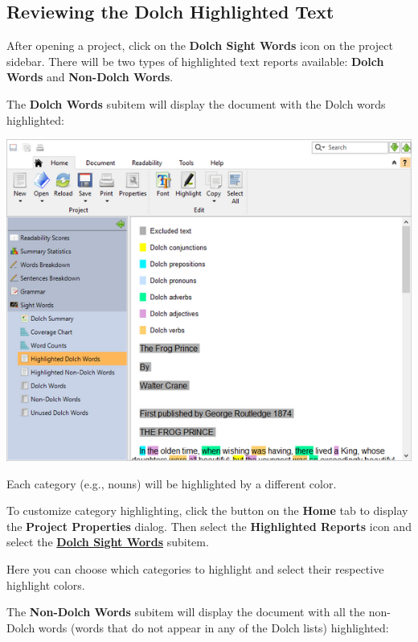 \documentclass[
]{book}
\theoremstyle{definition}
\theoremstyle{definition}
\theoremstyle{definition}
\theoremstyle{definition}
\theoremstyle{remark}
\begin{document}
\hypertarget{reviewing-dolch-text}{%
\subsection*{Reviewing the Dolch Highlighted Text}\label{reviewing-dolch-text}}

After opening a project, click on the \textbf{Dolch Sight Words} icon on the project sidebar. There will be two types of highlighted text reports available: \textbf{Dolch Words} and \textbf{Non-Dolch Words}.

The \textbf{Dolch Words} subitem will display the document with the Dolch words highlighted:

\includegraphics{Images/dolchhighlightedwords.png}

Each category (e.g., nouns) will be highlighted by a different color.

To customize category highlighting, click the  button on the \textbf{Home} tab to display the \textbf{Project Properties} dialog. Then select the \textbf{Highlighted Reports} icon and select the \protect\hyperlink{dolch-options}{\textbf{Dolch Sight Words}} subitem.


Here you can choose which categories to highlight and select their respective highlight colors.

The \textbf{Non-Dolch Words} subitem will display the document with all the non-Dolch words (words that do not appear in any of the Dolch lists) highlighted:
\end{document}

